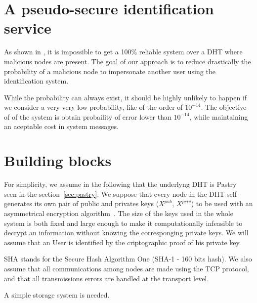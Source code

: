 
\section{A pseudo-secure identification service}
As shown in \cite{the_sybil_attack}, it is impossible to get a 100\% reliable
system over a DHT where malicious nodes are present. The goal of our approach
is to reduce drastically the probability of a malicious node to impersonate
another user using the identification system.

While the probability can always exist, it should be highly unlikely to happen
if we consider a very very low probability, like of the order of $10^{-14}$. The objective of of
the system is obtain probaility of error lower than $10^{-14}$, while
maintaining an aceptable cost in system messages.

\section{Building blocks}

For simplicity, we assume in the following that the underlyng DHT is
Pastry~\cite{pastry} seen in the section~\ref{sec:pastry}. We suppose that
every node in the DHT self-generates its own pair of public and privates keys
($X^{pub}$, $X^{priv}$) to be used with an asymmetrical encryption
algorithm~\cite{asymmetrical_encryption_algorithm}. The size of the keys used
in the whole system is both fixed and large enough to make it computationally
infeasible to decrypt an information without knowing the corresponging private
keys. We will assume that an User is identified by the criptographic proof of
his private key. 

SHA stands for the Secure Hash Algorithm One (SHA-1 - 160 bits hash). We also
assume that all communications among nodes are made using the TCP protocol, and
that all transmissions errors are handled at the transport level.

A simple storage system is needed.






